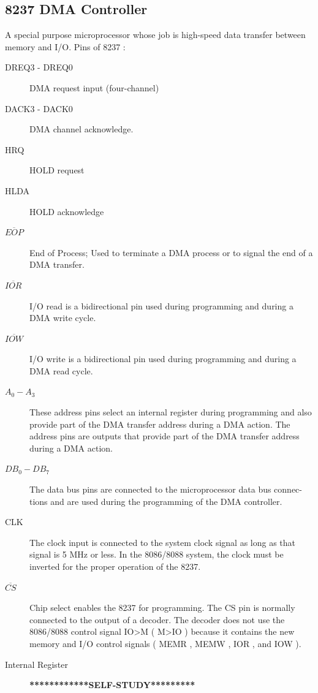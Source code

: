 \subsection{8237 DMA Controller}
A special purpose microprocessor whose job is high-speed data transfer between memory and I/O. \newline
Pins of 8237 : \newline
\begin{description}
  \item[DREQ3 - DREQ0] DMA request input (four-channel)
  \item[DACK3 - DACK0] DMA channel acknowledge.
  \item[HRQ] HOLD request
  \item[HLDA] HOLD acknowledge

  \item[$\overline{EOP}$] End of Process; Used to terminate a DMA process or to signal the end of a DMA transfer.

  \item[$\overline{IOR}$] I/O read is a bidirectional pin used during programming and during a DMA write cycle.
  \item[$\overline{IOW}$] I/O write is a bidirectional pin used during programming and during a DMA read cycle.
  \item[$A_0 - A_3$] These address pins select an internal register during programming and also provide part of the DMA transfer address during a DMA action. The address pins are outputs that provide part of the DMA transfer address during a DMA action.
  \item[$DB_0 - DB_7$] The data bus pins are connected to the microprocessor data bus connec-
  tions and are used during the programming of the DMA controller.
  \item[CLK] The clock input is connected to the system clock signal as long as that
  signal is 5 MHz or less. In the 8086/8088 system, the clock must be
  inverted for the proper operation of the 8237.
  \item[$\overline{CS}$] Chip select enables the 8237 for programming. The CS pin is normally
  connected to the output of a decoder. The decoder does not use the
  8086/8088 control signal IO>M ( M>IO ) because it contains the new
  memory and I/O control signals ( MEMR , MEMW , IOR , and IOW ).
  \item[Internal Register] \textbf{************SELF-STUDY*********}

\end{description}


